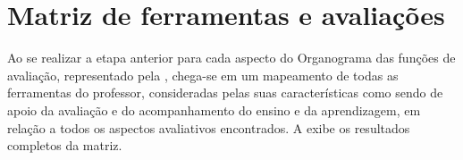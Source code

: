 
\section{Matriz de ferramentas e avaliações}%

Ao se realizar a etapa anterior para cada aspecto do Organograma das funções de avaliação, representado pela , chega-se em um mapeamento de todas as ferramentas do professor, consideradas pelas suas características como sendo de apoio da avaliação e do acompanhamento do ensino e da aprendizagem, em relação a todos os aspectos avaliativos encontrados. A  exibe os resultados completos da matriz.


